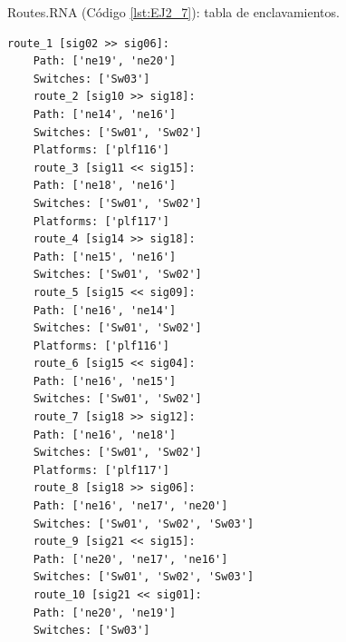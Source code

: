 	Routes.RNA (Código \ref{lst:EJ2_7}): tabla de enclavamientos.
	
	\begin{lstlisting}[language = {}, caption = Routes.RNA, label = {lst:EJ2_7}]
	route_1 [sig02 >> sig06]:
	Path: ['ne19', 'ne20']
	Switches: ['Sw03']
	route_2 [sig10 >> sig18]:
	Path: ['ne14', 'ne16']
	Switches: ['Sw01', 'Sw02']
	Platforms: ['plf116']
	route_3 [sig11 << sig15]:
	Path: ['ne18', 'ne16']
	Switches: ['Sw01', 'Sw02']
	Platforms: ['plf117']
	route_4 [sig14 >> sig18]:
	Path: ['ne15', 'ne16']
	Switches: ['Sw01', 'Sw02']
	route_5 [sig15 << sig09]:
	Path: ['ne16', 'ne14']
	Switches: ['Sw01', 'Sw02']
	Platforms: ['plf116']
	route_6 [sig15 << sig04]:
	Path: ['ne16', 'ne15']
	Switches: ['Sw01', 'Sw02']
	route_7 [sig18 >> sig12]:
	Path: ['ne16', 'ne18']
	Switches: ['Sw01', 'Sw02']
	Platforms: ['plf117']
	route_8 [sig18 >> sig06]:
	Path: ['ne16', 'ne17', 'ne20']
	Switches: ['Sw01', 'Sw02', 'Sw03']
	route_9 [sig21 << sig15]:
	Path: ['ne20', 'ne17', 'ne16']
	Switches: ['Sw01', 'Sw02', 'Sw03']
	route_10 [sig21 << sig01]:
	Path: ['ne20', 'ne19']
	Switches: ['Sw03']
	\end{lstlisting}
	

















